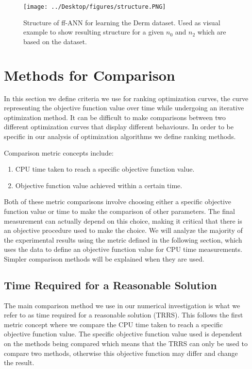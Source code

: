 \documentclass[letterpaper,12pt,titlepage,oneside,final]{book}
\begin{document}
	
	\begin{figure}[h]
		\centering
		\texttt{[image: ../Desktop/figures/structure.PNG]}
		\caption{Structure of ff-ANN for learning the Derm dataset. Used as visual example to show resulting structure for a given $n_{0}$ and $n_{2}$ which are based on the dataset.}
		\label{figure:structure}
	\end{figure}

	
	\section{Methods for Comparison}
	
	In this section we define criteria we use for ranking optimization curves, the curve representing the objective function value over time while undergoing an iterative optimization method. It can be difficult to make comparisons between two different optimization curves that display different behaviours. In order to be specific in our analysis of optimization algorithms we define ranking methods. 
	
	Comparison metric concepts include:
	\begin{enumerate}
		\item CPU time taken to reach a specific objective function value.
		\item Objective function value achieved within a certain time.
	\end{enumerate}
	
	Both of these metric comparisons involve choosing either a specific objective function value or time to make the comparison of other parameters. The final measurement can actually depend on this choice, making it critical that there is an objective procedure used to make the choice. We will analyze the majority of the experimental results using the metric defined in the following section, which uses the data to define an objective function value for CPU time measurements. Simpler comparison methods will be explained when they are used.
	
	\subsection{Time Required for a Reasonable Solution}
	
	The main comparison method we use in our numerical investigation is what we refer to as time required for a reasonable solution (TRRS). This follows the first metric concept where we compare the CPU time taken to reach a specific objective function value. The specific objective function value used is dependent on the methods being compared which means that the TRRS can only be used to compare two methods, otherwise this objective function may differ and change the result. 
	
\end{document}
